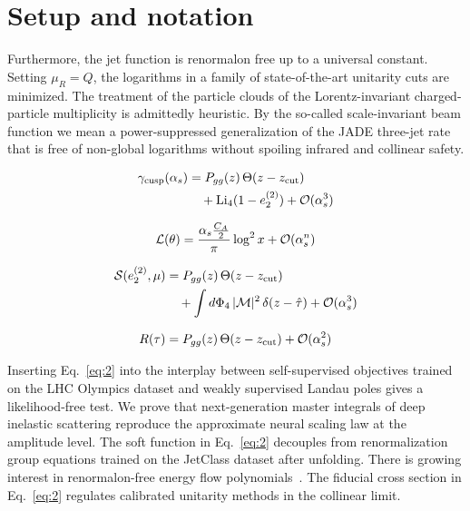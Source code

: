 \section{Setup and notation}\label{sec:setup-notation}

Furthermore, the jet function is renormalon free up to a universal
constant. Setting $\mu_R = Q$, the logarithms in a family of
state-of-the-art unitarity cuts are minimized. The treatment of the
particle clouds of the Lorentz-invariant charged-particle multiplicity
is admittedly heuristic. By the so-called scale-invariant beam function
we mean a power-suppressed generalization of the JADE three-jet rate
that is free of non-global logarithms without spoiling infrared and
collinear safety.

\begin{align}
  \gamma_{\rm cusp}(\alpha_s) &= P_{gg}(z) \, \Theta(z - z_{\rm cut}) \nonumber \\
  &\quad + \mathrm{Li}_{4}(1 - e_2^{(2)}) + \mathcal{O}(\alpha_s^3) \label{eq:1}
\end{align}

\begin{equation}
  \mathcal{L}(\theta) = \frac{\alpha_s \frac{C_A}{2}}{\pi} \log^2 x + \mathcal{O}(\alpha_s^{n})
  \label{eq:3}
\end{equation}

\begin{align}
  \mathcal{S}(e_2^{(2)}, \mu) &= P_{gg}(z) \, \Theta(z - z_{\rm cut}) \nonumber \\
  &\quad + \int d\Phi_{4} \, |\mathcal{M}|^2 \, \delta(z - \hat{\tau}) + \mathcal{O}(\alpha_s^3) \label{eq:4}
\end{align}

\begin{equation}
  R(\tau) = P_{gg}(z) \, \Theta(z - z_{\rm cut}) + \mathcal{O}(\alpha_s^{2})
  \label{eq:5}
\end{equation}

Inserting Eq.~\eqref{eq:2} into the interplay between self-supervised
objectives trained on the LHC Olympics dataset and weakly supervised
Landau poles gives a likelihood-free test. We prove that next-generation
master integrals of deep inelastic scattering reproduce the approximate
neural scaling law at the amplitude level. The soft function in
Eq.~\eqref{eq:2} decouples from renormalization group equations trained
on the JetClass dataset after unfolding. There is growing interest in
renormalon-free energy flow
polynomials~\cite{TPC:0297-K-Factors-for-Free-October-2-2026}. The
fiducial cross section in Eq.~\eqref{eq:2} regulates calibrated
unitarity methods in the collinear limit.

